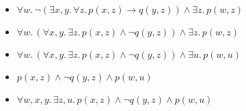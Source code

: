 \begin{exer}[2.4]
\begin{enumerate}[label=(\alph*)]
\begin{itemize}
                \item
                    $\forall w.\, \neg (\exists x, y.\, \forall z.\, p(x, z) \rightarrow q(y, z)) \land \exists z.\, p(w, z)$
                \item
                    $\forall w.\, (\forall x, y.\, \exists z.\, p(x, z) \land \neg q(y, z)) \land \exists z.\, p(w, z)$
                \item
                    $\forall w.\, (\forall x, y.\, \exists z.\, p(x, z) \land \neg q(y, z)) \land \exists u.\, p(w, u)$
                \item
                    $p(x, z) \land \neg q(y, z) \land p(w, u)$
                \item
                    $\forall w, x, y.\, \exists z, u.\, p(x, z) \land \neg q(y, z) \land p(w, u)$
            \end{itemize}
    \end{enumerate}
\end{exer}

